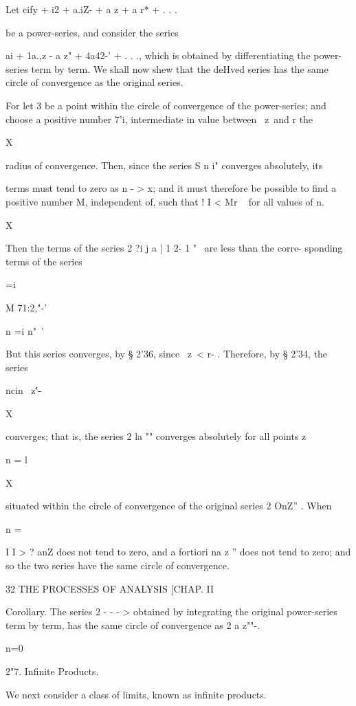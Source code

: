 Let cify + i2 + a.iZ- + a z + a r* + . . .

be a power-series, and consider the series

ai + 1a.,z - a z" + 4a42-' + . . ., which is obtained by
differentiating the power-series term by term. We shall now shew that
the deHved series has the same circle of convergence as the original
series.

For let 3 be a point within the circle of convergence of the
power-series; and choose a positive number 7'i, intermediate in value
between \ z\ and r the

X

radius of convergence. Then, since the series S n i" converges
absolutely, its

terms must tend to zero as n - > x; and it must therefore be possible
to find a positive number M, independent of, such that ! I < Mr ~ for
all values of n.

 X

Then the terms of the series 2 ?i j a | 1 2- 1 "~ are less than the
corre- sponding terms of the series



 =i



M 71:2,"-'

n =i n"~'

But this series converges, by § 2'36, since \ z\ < r- . Therefore, by
§ 2'34, the series

 ncin \ z\''-

X

converges; that is, the series 2 la "" converges absolutely for all
points z

n = l

X

situated within the circle of convergence of the original series 2
OnZ'' . When

n =

I I > ? anZ does not tend to zero, and a fortiori na z '' does not
tend to zero; and so the two series have the same circle of
convergence.



32 THE PROCESSES OF ANALYSIS [CHAP. II

Corollary. The series 2 - - - > obtained by integrating the original
power-series term by term, has the same circle of convergence as 2 a
z""-.

n=0

2"7. Infinite Products.

We next consider a class of limits, known as infinite products.

